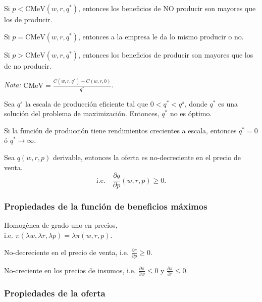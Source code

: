 \documentclass[8pt,a4paper]{extarticle}
\begin{document}
\begin{multicols}{3}
\begin{eqlist}
\item Si $p < \text{CMeV} (w, r, q^*)$, entonces los beneficios de NO producir son mayores que los de producir.
\item Si $p = \text{CMeV} (w, r, q^*)$, entonces a la empresa le da lo mismo producir o no.
\item Si $p > \text{CMeV} (w, r, q^*)$, entonces los beneficios de producir son mayores que los de no producir.
\end{eqlist}

\textit{Nota:} $\displaystyle \text{CMeV} = \frac{C(w, r, q^*) - C(w, r, 0)}{q^*}$.

\begin{boxprop}
	Sea $q^s$ la escala de producción eficiente tal que $0 < q^* < q^s$, donde $q^*$ es una solución del problema de maximización. Entonces, $q^*$ no es óptimo.
\end{boxprop}

\begin{boxprop}
	Si la función de producción tiene rendimientos crecientes a escala, entonces $q^* = 0$ ó $q^* \to \infty$.
\end{boxprop}

\begin{boxtheo}
	Sea $q(w, r, p)$ derivable, entonces la oferta es no-decreciente en el precio de venta.
	\[
		\text{i.e.}\quad \frac{\partial q}{\partial p} (w, r, p) \ge 0
	.\] 
\end{boxtheo}

\subsubsection{Propiedades de la función de beneficios máximos}

\begin{eqlist}
\item Homogénea de grado uno en precios, \\ i.e. $\pi (\lambda w, \lambda r, \lambda p) = \lambda \pi(w, r, p)$.
\item No-decreciente en el precio de venta, i.e. $\displaystyle \frac{\partial \pi}{\partial p} \ge 0$.
\item No-creciente en los precios de insumos, i.e. $\displaystyle \frac{\partial \pi}{\partial w} \le 0$ y $\displaystyle \frac{\partial \pi}{\partial r} \le 0$.
\end{eqlist}

\subsubsection{Propiedades de la oferta}


\end{multicols}
\end{document}
